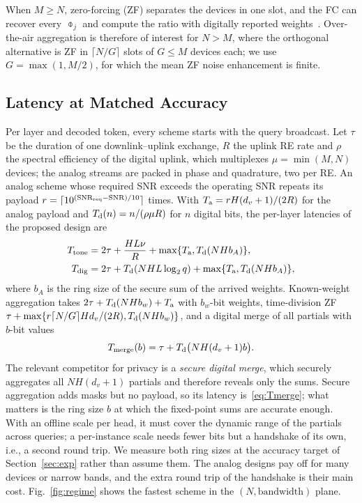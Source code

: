 When $M\ge N$, zero-forcing (ZF) separates the devices in one slot, and the FC can recover every $\obar_j$ and compute the ratio with digitally reported weights~\cite{chen2024view}. Over-the-air aggregation is therefore of interest for $N>M$, where the orthogonal alternative is ZF in $\lceil N/G\rceil$ slots of $G\le M$ devices each; we use $G=\max(1,M/2)$, for which the mean ZF noise enhancement is finite.

\subsection{Latency at Matched Accuracy}

Per layer and decoded token, every scheme starts with the query broadcast. Let $\tau$ be the duration of one downlink--uplink exchange, $R$ the uplink RE rate and $\rho$ the spectral efficiency of the digital uplink, which multiplexes $\mu=\min(M,N)$ devices; the analog streams are packed in phase and quadrature, two per RE. An analog scheme whose required SNR exceeds the operating SNR repeats its payload $r=\lceil10^{(\mathrm{SNR}_{\rm req}-\mathrm{SNR})/10}\rceil$ times. With $T_{\rm a}=rH(d_v+1)/(2R)$ for the analog payload and $T_{\rm d}(n)=n/(\rho\mu R)$ for $n$ digital bits, the per-layer latencies of the proposed design are
\begin{align}
T_{\rm tone}&=2\tau+\frac{HL\nu}{R}+\max\{T_{\rm a},T_{\rm d}(NHb_A)\},\\
T_{\rm dig}&=2\tau+T_{\rm d}(NHL\log_2q)+\max\{T_{\rm a},T_{\rm d}(NHb_A)\},
\end{align}
where $b_A$ is the ring size of the secure sum of the arrived weights. Known-weight aggregation takes $2\tau+T_{\rm d}(NHb_w)+T_{\rm a}$ with $b_w$-bit weights, time-division ZF $\tau+\max\{r\lceil N/G\rceil Hd_v/(2R),T_{\rm d}(NHb_w)\}$, and a digital merge of all partials with $b$-bit values
\begin{equation}
T_{\rm merge}(b)=\tau+T_{\rm d}\big(NH(d_v+1)b\big).
\label{eq:Tmerge}
\end{equation}
The relevant competitor for privacy is a \emph{secure digital merge}, which securely aggregates all $NH(d_v+1)$ partials and therefore reveals only the sums. Secure aggregation adds masks but no payload, so its latency is~\eqref{eq:Tmerge}; what matters is the ring size $b$ at which the fixed-point sums are accurate enough. With an offline scale per head, it must cover the dynamic range of the partials across queries; a per-instance scale needs fewer bits but a handshake of its own, i.e., a second round trip. We measure both ring sizes at the accuracy target of Section~\ref{sec:exp} rather than assume them. The analog designs pay off for many devices or narrow bands, and the extra round trip of the handshake is their main cost. Fig.~\ref{fig:regime} shows the fastest scheme in the $(N,\text{bandwidth})$ plane.

